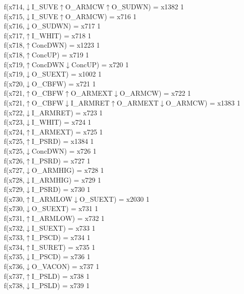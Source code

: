 f(x714,$\downarrow$I\_SUVE$\uparrow$O\_ARMCW$\uparrow$O\_SUDWN) = x1382 {1} \\
f(x715,$\downarrow$I\_SUVE$\uparrow$O\_ARMCW) = x716 {1} \\
f(x716,$\downarrow$O\_SUDWN) = x717 {1} \\
f(x717,$\uparrow$I\_WHIT) = x718 {1} \\
f(x718,$\uparrow$ConcDWN) = x1223 {1} \\
f(x718,$\uparrow$ConcUP) = x719 {1} \\
f(x719,$\uparrow$ConcDWN$\downarrow$ConcUP) = x720 {1} \\
f(x719,$\downarrow$O\_SUEXT) = x1002 {1} \\
f(x720,$\downarrow$O\_CBFW) = x721 {1} \\
f(x721,$\uparrow$O\_CBFW$\uparrow$O\_ARMEXT$\downarrow$O\_ARMCW) = x722 {1} \\
f(x721,$\uparrow$O\_CBFW$\downarrow$I\_ARMRET$\uparrow$O\_ARMEXT$\downarrow$O\_ARMCW) = x1383 {1} \\
f(x722,$\downarrow$I\_ARMRET) = x723 {1} \\
f(x723,$\downarrow$I\_WHIT) = x724 {1} \\
f(x724,$\uparrow$I\_ARMEXT) = x725 {1} \\
f(x725,$\uparrow$I\_PSRD) = x1384 {1} \\
f(x725,$\downarrow$ConcDWN) = x726 {1} \\
f(x726,$\uparrow$I\_PSRD) = x727 {1} \\
f(x727,$\downarrow$O\_ARMHIG) = x728 {1} \\
f(x728,$\downarrow$I\_ARMHIG) = x729 {1} \\
f(x729,$\downarrow$I\_PSRD) = x730 {1} \\
f(x730,$\uparrow$I\_ARMLOW$\downarrow$O\_SUEXT) = x2030 {1} \\
f(x730,$\downarrow$O\_SUEXT) = x731 {1} \\
f(x731,$\uparrow$I\_ARMLOW) = x732 {1} \\
f(x732,$\downarrow$I\_SUEXT) = x733 {1} \\
f(x733,$\uparrow$I\_PSCD) = x734 {1} \\
f(x734,$\uparrow$I\_SURET) = x735 {1} \\
f(x735,$\downarrow$I\_PSCD) = x736 {1} \\
f(x736,$\downarrow$O\_VACON) = x737 {1} \\
f(x737,$\uparrow$I\_PSLD) = x738 {1} \\
f(x738,$\downarrow$I\_PSLD) = x739 {1} \\
